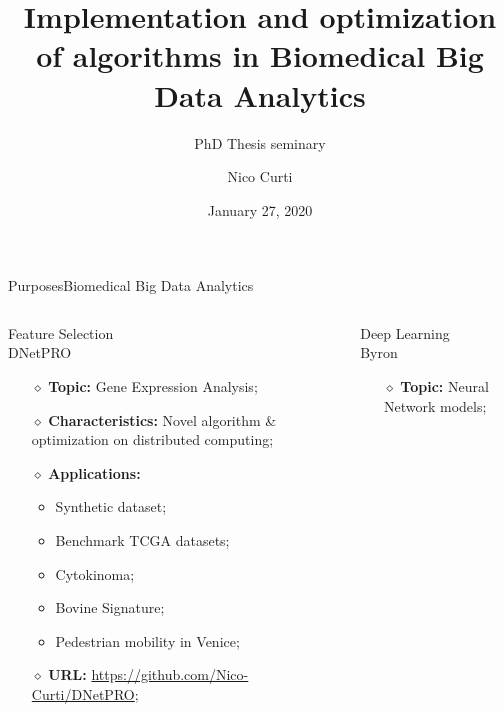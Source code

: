 \documentclass[10pt, technote, oribibl, unicode]{beamer}
\title{Implementation and optimization of algorithms in Biomedical Big Data Analytics}
\subtitle{PhD Thesis seminary}
\date[January 27, 2020]{January 27, 2020}
\author[Nico Curti]{Nico Curti}
\begin{document}
\begin{frame}

  \titlepage

\end{frame}


\begin{frame}{Purposes}{Biomedical Big Data Analytics}

  \begin{columns}

    \begin{column}{0.5\textwidth}

      \begin{exampleblock}{Feature Selection\\DNetPRO}
        \begin{itemize}
          \item[$\diamond$] \textbf{Topic:} Gene Expression Analysis;

          \item[$\diamond$] \textbf{Characteristics:} Novel algorithm \& optimization on distributed computing;

          \item[$\diamond$] \textbf{Applications:}
            \begin{itemize}
              \item Synthetic dataset;
              \item Benchmark TCGA datasets;
              \item Cytokinoma;
              \item Bovine Signature;
              \item Pedestrian mobility in Venice;
            \end{itemize}

          \item[$\diamond$] \textbf{URL:} \url{https://github.com/Nico-Curti/DNetPRO};
        \end{itemize}
      \end{exampleblock}

    \end{column}
    \begin{column}{0.5\textwidth}

      \begin{block}{Deep Learning\\Byron}
        \begin{itemize}
          \item[$\diamond$] \textbf{Topic:} Neural Network models;


\end{itemize}
\end{block}
\end{column}
\end{columns}
\end{frame}
\end{document}
